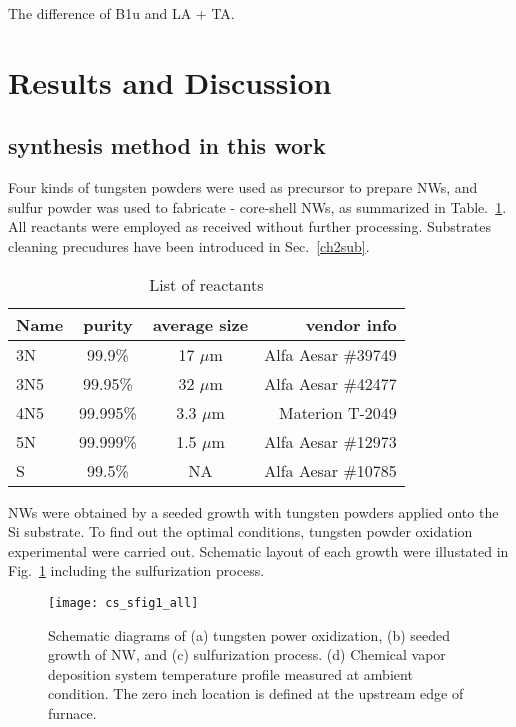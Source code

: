 The difference of B1u and LA + TA.

\section{Results and Discussion}

\subsection{synthesis method in this work}

Four kinds of tungsten powders were used as precursor to prepare  NWs, and sulfur powder was used to fabricate - core-shell NWs, as summarized in Table.~\ref{tab:ch5pre}. All reactants were employed as received without further processing. Substrates cleaning precudures have been introduced in Sec.~\ref{ch2sub}. 

\begin{table}[htb]
\centering
\caption{List of reactants}\label{tab:ch5pre}
\begin{tabular}{lccr}
\toprule
Name & purity & average size & vendor info\\
\midrule
3N   &  99.9\% & 17 $\mu$m & Alfa Aesar \#39749\\
3N5   &  99.95\% & 32 $\mu$m  & Alfa Aesar \#42477\\
4N5   &  99.995\% & 3.3 $\mu$m  & Materion T-2049 \\
5N   &  99.999\% & 1.5 $\mu$m & Alfa Aesar \#12973\\
S    &   99.5\%  &  NA  & Alfa Aesar \#10785\\
\bottomrule
\end{tabular}
\end{table}

 NWs were obtained by a seeded growth with tungsten powders applied onto the Si substrate. To find out the optimal conditions, tungsten powder oxidation experimental were carried out. Schematic layout of each growth were illustated in Fig.~\ref{fig:ch5grow} including the sulfurization process.   

\begin{figure}[htb]
\centering
\texttt{[image: cs\_sfig1\_all]}
\caption[ NW growth: OT]{Schematic diagrams of (a) tungsten power oxidization, (b) seeded growth of  NW, and (c) sulfurization process. (d) Chemical vapor deposition system temperature profile measured at ambient condition. The zero inch location is defined at the upstream edge of furnace.}
\label{fig:ch5grow}
\end{figure}


